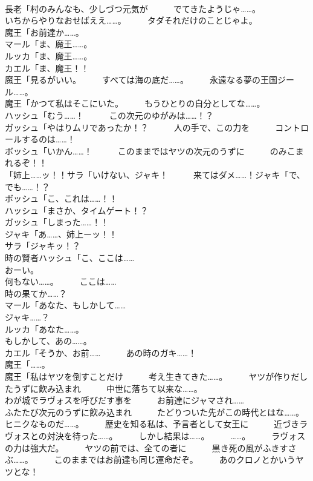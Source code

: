 \documentclass[8pt]{extreport}
\begin{document}
\begin{CJK}{UTF8}{min}
\\	長老「村のみんなも、少しづつ元気が　　　でてきたようじゃ……。	
\\	いちからやりなおせばええ……。　　　タダそれだけのことじゃよ。	
\\	魔王「お前達か……。	
\\	マール「ま、魔王……。	
\\	ルッカ「ま、魔王……。	
\\	カエル「ま、魔王！！	
\\	魔王「見るがいい。　　　すべては海の底だ……。　　　永遠なる夢の王国ジール……。	
\\	魔王「かつて私はそこにいた。　　　もうひとりの自分としてな……。	
\\	ハッシュ「むう……！　　　この次元のゆがみは……！？	
\\	ガッシュ「やはりムリであったか！？　　　人の手で、この力を　　　コントロールするのは……！	
\\	ボッシュ「いかん……！　　　このままではヤツの次元のうずに　　　のみこまれるぞ！！	
\\	「姉上……ッ！！サラ「いけない、ジャキ！　　　来てはダメ……！ジャキ「で、でも……！？	
\\	ボッシュ「こ、これは……！！	
\\	ハッシュ「まさか、タイムゲート！？	
\\	ガッシュ「しまった……！！	
\\	ジャキ「あ……、姉上ーッ！！	
\\	サラ「ジャキッ！？	
\\	時の賢者ハッシュ「こ、ここは……	
\\	おーい。	
\\	何もない……。　　　ここは……	
\\	時の果てか……？	
\\	マール「あなた、もしかして……	
\\	ジャキ……？	
\\	ルッカ「あなた……。	
\\	もしかして、あの……。	
\\	カエル「そうか、お前……　　　あの時のガキ……！	
\\	魔王「……。	
\\	魔王「私はヤツを倒すことだけ　　　考え生きてきた……。　　　ヤツが作りだしたうずに飮み込まれ　　　中世に落ちて以来な……。	
\\	わが城でラヴォスを呼びだす事を　　　お前達にジャマされ……	
\\	ふたたび次元のうずに飮み込まれ　　　たどりついた先がこの時代とはな……。　　　ヒニクなものだ……。　　　歴史を知る私は、予言者として女王に　　　近づきラヴォスとの対決を待った……。　　　しかし結果は……。　　　……。　　　ラヴォスの力は強大だ。　　　ヤツの前では、全ての者に　　　黒き死の風がふきすさぶ……。　　　このままではお前達も同じ運命だぞ。　　　あのクロノとかいうヤツとな！	

\end{CJK}
\end{document}
